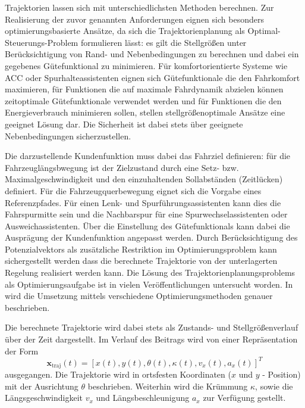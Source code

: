 Trajektorien lassen sich mit unterschiedlichsten Methoden berechnen.  Zur Realisierung der zuvor genannten Anforderungen eignen sich besonders optimierungsbasierte Ansätze, da sich die Trajektorienplanung als Optimal-Steuerungs-Problem formulieren lässt: es gilt die Stellgrößen unter Berücksichtigung von Rand- und Nebenbedingungen zu berechnen und dabei ein gegebenes Gütefunktional zu minimieren. Für komfortorientierte Systeme wie ACC oder Spurhalteassistenten eignen sich Gütefunktionale die den Fahrkomfort maximieren, für Funktionen die auf maximale Fahrdynamik abzielen können zeitoptimale Gütefunktionale verwendet werden und für Funktionen die den Energieverbrauch minimieren sollen, stellen stellgrößenoptimale Ansätze eine geeignet Lösung dar. Die Sicherheit ist dabei stets über geeignete Nebenbedingungen sicherzustellen.

Die darzustellende Kundenfunktion muss dabei das Fahrziel definieren: für die Fahrzeuglängsbwegung ist der Zielzustand durch eine Setz- bzw. Maximalgeschwindigkeit und den einzuhaltenden Sollabständen (Zeitlücken) definiert. Für die Fahrzeugquerbewegung eignet sich die Vorgabe eines Referenzpfades. Für einen Lenk- und Spurführungsassistenten kann dies die Fahrspurmitte sein und die Nachbarspur für eine Spurwechselassistenten oder Ausweichassistenten.   
Über die Einstellung des Gütefunktionals kann dabei die Ausprägung der Kundenfunktion angepasst werden.   Durch Berücksichtigung des Potenzialvektors als zusätzliche Restriktion im Optimierungsproblem kann sichergestellt werden dass die berechnete Trajektorie von der unterlagerten Regelung realisiert werden kann.
Die Lösung des Trajektorienplanungsproblems als Optimierungsaufgabe ist in vielen Veröffentlichungen untersucht worden.  In \cite{Werling2016b} wird die Umsetzung mittels verschiedene Optimierungsmethoden genauer beschrieben. 

Die berechnete Trajektorie wird dabei stets als Zustands- und Stellgrößenverlauf über der Zeit dargestellt. Im Verlauf des Beitrags wird von einer Repräsentation der Form
\begin{equation}
\mathbf{x}_\mathrm{traj}(t) = [x(t), y(t), \theta(t), \kappa(t), v_x(t), a_x(t)]^T
\end{equation}
ausgegangen. Die Trajektorie wird in ortsfesten Koordinaten ($x$ und $y$ - Position) mit der Ausrichtung $\theta$ beschrieben. Weiterhin wird die Krümmung $\kappa$,  sowie die Längsgeschwindigkeit $v_x$ und Längsbeschleunigung $a_x$ zur Verfügung gestellt.

